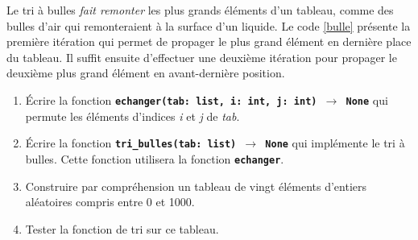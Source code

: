 \documentclass[a4paper,11pt]{article}
\begin{document}
\begin{exo}
Le tri à bulles \emph{fait remonter} les plus grands éléments d'un tableau, comme des bulles d'air qui remonteraient à la surface d'un liquide. Le code \ref{bulle} présente la première itération qui permet de propager le plus grand élément en dernière place du tableau. Il suffit ensuite d'effectuer une deuxième itération pour propager le deuxième plus grand élément en avant-dernière position.
    \begin{center}
        \label{bulle}
        \end{center}

\begin{enumerate}
    \item Écrire la fonction \textbf{\texttt{echanger(tab: list, i: int, j: int) $\rightarrow$ None}} qui permute les éléments d'indices \emph{i} et \emph{j} de \emph{tab}.
    \item Écrire la fonction \textbf{\texttt{tri\_bulles(tab: list) $\rightarrow$ None}} qui implémente le tri à bulles. Cette fonction utilisera la fonction \textbf{\texttt{echanger}}.
    \item Construire par compréhension un tableau de vingt éléments d'entiers aléatoires compris entre 0 et 1000.
    \item Tester la fonction de tri sur ce tableau.
\end{enumerate}
\end{exo}
\end{document}
